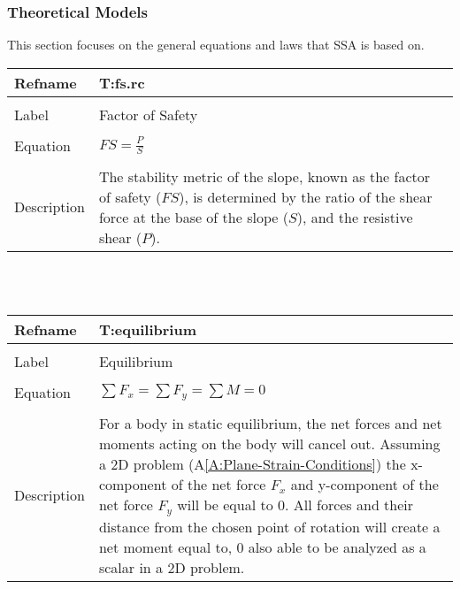 \documentclass[12pt]{article}
\begin{document}
\subsubsection{Theoretical Models}
\label{Sec:TMs}
This section focuses on the general equations and laws that SSA is based on.
~\newline
\noindent \begin{minipage}{\textwidth}
\begin{tabular}{p{} p{}}
\toprule \textbf{Refname} & \textbf{T:fs.rc}
\label{T:fs.rc}
\\ \midrule \\
Label & Factor of Safety
\\ \midrule \\
Equation & $FS=\frac{P}{S}$
\\ \midrule \\
Description & The stability metric of the slope, known as the factor of safety ($FS$), is determined by the ratio of the shear force at the base of the slope ($S$), and the resistive shear ($P$).
\\ \bottomrule \end{tabular}
\end{minipage}\\
~\newline
\noindent \begin{minipage}{\textwidth}
\begin{tabular}{p{} p{}}
\toprule \textbf{Refname} & \textbf{T:equilibrium}
\label{T:equilibrium}
\\ \midrule \\
Label & Equilibrium
\\ \midrule \\
Equation & $\displaystyle\sum{{F_{x}}}=\displaystyle\sum{{F_{y}}}=\displaystyle\sum{M}=0$
\\ \midrule \\
Description & For a body in static equilibrium, the net forces and net moments acting on the body will cancel out. Assuming a 2D problem (A\ref{A:Plane-Strain-Conditions}) the x-component of the net force ${F_{x}}$ and y-component of the net force ${F_{y}}$ will be equal to $0$. All forces and their distance from the chosen point of rotation will create a net moment equal to, $0$ also able to be analyzed as a scalar in a 2D problem.
\\ \bottomrule \end{tabular}
\end{minipage}\\
\end{document}
